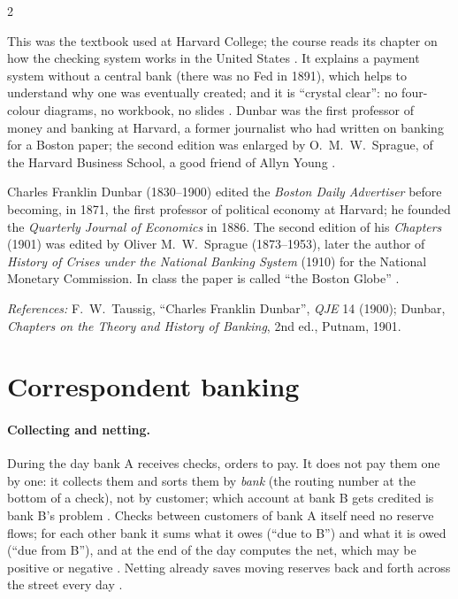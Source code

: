 \begin{paracol}{2}
\begin{reading}
This was the textbook used at Harvard College; the course reads its chapter on how the checking system works in the United States
. It explains a payment system without a central bank (there was no Fed in 1891), which helps to understand why one was
eventually created; and it is ``crystal clear'': no four-colour diagrams, no workbook, no slides . Dunbar was
the first professor of money and banking at Harvard, a former journalist who had written on banking for a Boston paper; the second edition
was enlarged by O.~M.~W.~Sprague, of the Harvard Business School, a good friend of Allyn Young .
\end{reading}\begin{history}
Charles Franklin Dunbar (1830--1900) edited the \emph{Boston Daily Advertiser} before becoming, in 1871, the first professor of political economy
at Harvard; he founded the \emph{Quarterly Journal of Economics} in 1886. The second edition of his \emph{Chapters} (1901) was edited by Oliver
M.~W.~Sprague (1873--1953), later the author of \emph{History of Crises under the National Banking System} (1910) for the National Monetary
Commission. In class the paper is called ``the Boston Globe'' .\par
\emph{References:} F.~W.~Taussig, ``Charles Franklin Dunbar'', \emph{QJE} 14 (1900); Dunbar, \emph{Chapters on the Theory and History of
Banking}, 2nd ed., Putnam, 1901.
\end{history}

\section{Correspondent banking}\label{sec:ch-corr}

\paragraph{Collecting and netting.} During the day bank A receives checks, orders to pay. It does not pay them one by one: it collects them
and sorts them by \emph{bank} (the routing number at the bottom of a check), not by customer; which account at bank B gets credited is bank B's
problem . Checks between customers of bank A itself need no reserve flows; for each other bank it
sums what it owes (``due to B'') and what it is owed (``due from B''), and at the end of the day computes the net, which may be positive or
negative . Netting already saves moving reserves back and forth across the street every
day .


\end{paracol}
